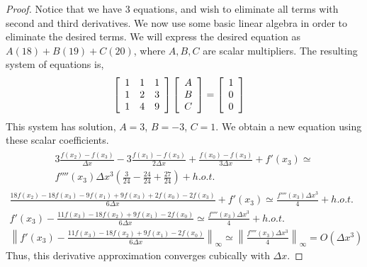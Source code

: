 \documentclass{article}
\begin{document}
\begin{enumerate}[label=\alph*)]
\begin{proof}
        Notice that we have 3 equations, and wish to eliminate all terms with second and third derivatives. We now use some basic linear algebra in order to eliminate the desired terms. We will express the desired equation as $A(18) + B(19) + C(20)$, where $A, B, C$ are scalar multipliers. The resulting system of equations is, 
    \begin{align}
        \left[ \begin{array}{c c c} 1 & 1 & 1 \\ 1 & 2 & 3 \\ 1 & 4 & 9 \end{array} \right] \left[ \begin{array}{c} A  \\ B \\ C\end{array}\right] &= \left[\begin{array}{c} 1 \\ 0 \\ 0\end{array}\right]
    \end{align}
    This system has solution, $A = 3$, $B = -3$, $C = 1$. We obtain a new equation using these scalar coefficients. 
    \begin{align}
        \begin{split}
            3\frac{f(x_2) - f(x_3)}{\Delta x} -3\frac{f(x_1) - f(x_3)}{2\Delta x} +  \frac{f(x_0) - f(x_3)}{3\Delta x} + f'(x_3)  \simeq \\ f''''(x_3)\Delta x^3 \left(\frac{3}{24} -  \frac{24}{24} + \frac{27}{24}\right) + h.o.t. 
        \end{split}
    \end{align}
    \begin{align}
            \frac{18f(x_2) - 18f(x_3) - 9f(x_1) + 9f(x_3) + 2f(x_0) - 2f(x_3)}{6\Delta x} + f'(x_3)  \simeq \frac{f''''(x_3)\Delta x^3}{4} + h.o.t. \\
            f'(x_3) - \frac{11f(x_3) - 18f(x_2)  + 9f(x_1) -  2f(x_0)}{6\Delta x}  \simeq \frac{f''''(x_3)\Delta x^3}{4} + h.o.t. \\
            \left\lVert f'(x_3) - \frac{11f(x_3) - 18f(x_2)  + 9f(x_1) -  2f(x_0)}{6\Delta x}\right\rVert_{\infty} \simeq \left\lVert\frac{f''''(x_3)\Delta x^3}{4}\right\rVert_{\infty} = O(\Delta x^3)
    \end{align}
        Thus, this derivative approximation converges cubically with $\Delta x$.

    \end{proof}
        

\end{enumerate}
\end{document}
